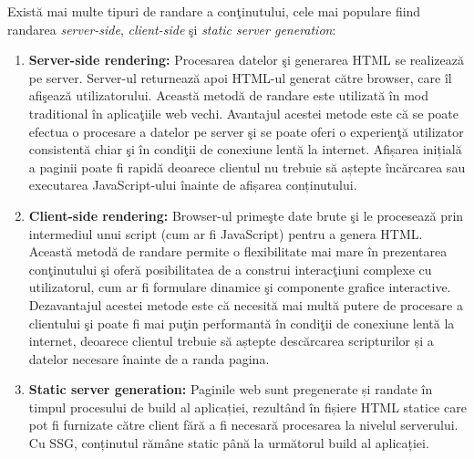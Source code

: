 \documentclass[12pt, a4paper]{report}
\begin{document}
Exist\u a mai multe tipuri de randare a con\c tinutului, cele mai populare fiind randarea \emph{server-side}, \emph{client-side} \c si  \emph{static server generation}: \cite{clientsidevssercerside}
\begin{enumerate}
	\item \textbf{Server-side rendering:} Procesarea datelor \c si generarea HTML se realizeaz\u a pe server. Server-ul returneaz\u a apoi HTML-ul generat c\u atre browser, care \^il afi\c seaz\u a utilizatorului. Aceast\u a metod\u a de randare este utilizat\u a \^in mod traditional \^in aplica\c tiile web vechi. Avantajul acestei metode este c\u a se poate efectua o procesare a datelor pe server \c si se poate oferi o experien\c t\u a utilizator consistent\u a chiar \c si \^in condi\c tii de conexiune lent\u a la internet. Afișarea inițială a paginii poate fi rapidă deoarece clientul nu trebuie să aștepte încărcarea sau executarea JavaScript-ului înainte de afișarea conținutului.
	\item \textbf{Client-side rendering:} Browser-ul prime\c ste date brute \c si le proceseaz\u a prin intermediul unui script (cum ar fi JavaScript) pentru a genera HTML. Aceast\u a metod\u a de randare permite o flexibilitate mai mare \^in prezentarea con\c tinutului \c si ofer\u a posibilitatea de a construi interac\c tiuni complexe cu utilizatorul, cum ar fi formulare dinamice \c si componente grafice interactive. Dezavantajul acestei metode este c\u a necesit\u a mai mult\u a putere de procesare a clientului \c si poate fi mai pu\c tin performant\u a \^in condi\c tii de conexiune lent\u a la internet, deoarece clientul trebuie să aștepte descărcarea scripturilor și a datelor necesare înainte de a randa pagina.
	\item \textbf{Static server generation:} Paginile web sunt pregenerate și randate în timpul procesului de build al aplicației, rezultând în fișiere HTML statice care pot fi furnizate către client fără a fi necesară procesarea la nivelul serverului. Cu SSG, conținutul rămâne static până la următorul build al aplicației.
\end{enumerate}

\end{document}
